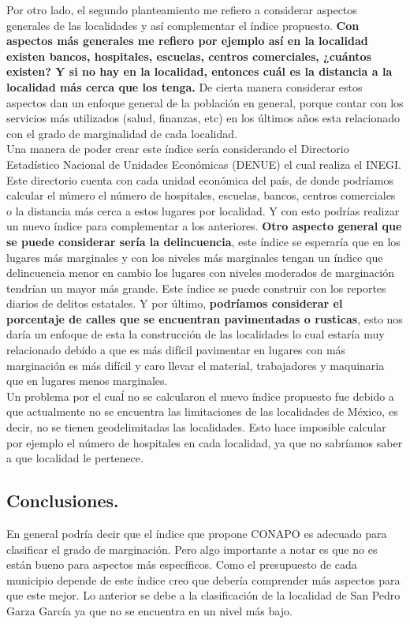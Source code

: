 \documentclass[paper=letter, fontsize=11pt]{scrartcl}
\numberwithin{equation}{section} %
\numberwithin{figure}{section} %
\numberwithin{table}{section} %
\begin{document}
Por otro lado, el segundo planteamiento me refiero a considerar aspectos generales de las localidades y así complementar el índice propuesto. \textbf{Con aspectos más generales me refiero por ejemplo así en la localidad existen bancos, hospitales, escuelas, centros comerciales, ¿cuántos existen? Y si no hay en la localidad, entonces cuál es la distancia a la localidad más cerca que los tenga.} De cierta manera considerar estos aspectos dan un enfoque general de la población en general, porque contar con los servicios más utilizados (salud, finanzas, etc) en los últimos años esta relacionado con el grado de marginalidad de cada localidad. \\

Una manera de poder crear este índice sería considerando el Directorio Estadístico Nacional de Unidades Económicas (DENUE) el cual realiza el INEGI. Este directorio cuenta con cada unidad económica del país, de donde podríamos calcular el número el número de hospitales, escuelas, bancos, centros comerciales o la distancia más cerca a estos lugares por localidad. Y con esto podrías realizar un nuevo índice para complementar a los  anteriores.  \textbf{Otro aspecto general que se puede considerar sería la delincuencia}, este índice se esperaría que en los lugares más marginales y con los niveles más marginales tengan un índice que delincuencia menor en cambio los lugares con niveles moderados de marginación tendrían un mayor más grande. Este índice se puede construir con los reportes diarios de delitos estatales. Y por último, \textbf{podríamos considerar el porcentaje de calles que se encuentran pavimentadas o rusticas}, esto nos daría un enfoque de esta la construcción de las localidades lo cual estaría muy relacionado debido a que es más difícil pavimentar en lugares con más marginación es más difícil y caro llevar el material, trabajadores y maquinaria que en lugares menos marginales.  \\

Un problema por el cuaĺ no se calcularon el nuevo índice propuesto fue debido a que actualmente no se encuentra las limitaciones de las localidades de México, es decir, no se tienen geodelimitadas las localidades. Esto hace imposible calcular por ejemplo el número de hospitales en cada localidad, ya que no sabríamos saber a que localidad le pertenece. 
\subsection{Conclusiones.}
En general podría decir que el índice que propone CONAPO es adecuado para clasificar el grado de marginación. Pero algo importante a notar es que no es están bueno para aspectos más específicos. Como el presupuesto de cada municipio depende de este índice creo que debería comprender más aspectos para que este mejor. Lo anterior se debe a la clasificación de la localidad de San Pedro Garza García ya que no se encuentra en un nivel más bajo. \\
\end{document}
